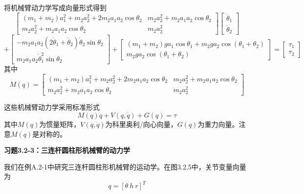 \documentclass[12pt,a4paper]{ctexart}
\begin{document}
将机械臂动力学写成向量形式得到
\begin{equation}
\begin{bmatrix} (m_1+m_2)a_1^2 + m_2a_2^2 + 2m_2a_1a_2\cos\theta_2 & m_2a_2^2 + m_2a_1a_2\cos\theta_2 \\ m_2a_2^2 + m_2a_1a_2\cos\theta_2 & m_2a_2^2 \end{bmatrix} \begin{bmatrix} \ddot{\theta}_1 \\ \ddot{\theta}_2 \end{bmatrix}
\end{equation}
\begin{equation}
+ \begin{bmatrix} -m_2a_1a_2(2\dot{\theta}_1+\dot{\theta}_2)\dot{\theta}_2\sin\theta_2 \\ m_2a_1a_2\dot{\theta}_1^2\sin\theta_2 \end{bmatrix} + \begin{bmatrix} (m_1+m_2)ga_1\cos\theta_1 + m_2ga_2\cos(\theta_1+\theta_2) \\ m_2ga_2\cos(\theta_1+\theta_2) \end{bmatrix} = \begin{bmatrix} \tau_1 \\ \tau_2 \end{bmatrix}
\end{equation}
其中
\begin{equation}
M(q) = \begin{bmatrix} (m_1+m_2)a_1^2 + m_2a_2^2 + 2m_2a_1a_2\cos\theta_2 & m_2a_2^2 + m_2a_1a_2\cos\theta_2 \\ m_2a_2^2 + m_2a_1a_2\cos\theta_2 & m_2a_2^2 \end{bmatrix}
\end{equation}

这些机械臂动力学采用标准形式
\begin{equation}
M(q)\ddot{q} + V(q,\dot{q}) + G(q) = \tau
\end{equation}
其中$M(q)$为惯量矩阵，$V(q,\dot{q})$为科里奥利/向心向量，$G(q)$为重力向量。注意$M(q)$是对称的。

\textbf{习题3.2-3：三连杆圆柱形机械臂的动力学}

我们在例A.2-1中研究三连杆圆柱形机械臂的运动学。在图3.2.5中，关节变量向量为
\begin{equation}
q = [\theta \ h \ r]^T
\end{equation}
\end{document}

